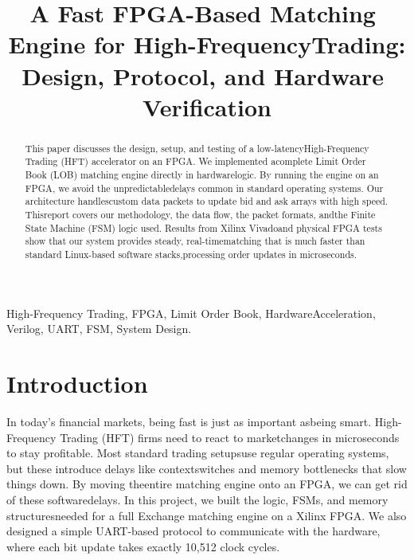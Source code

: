\documentclass[conference,a4paper]{IEEEtran}
\begin{document}
\title{\Large ​A Fast ​FPGA-Based ​Matching ​Engine ​for ​High-Frequency ​Trading: ​Design, ​Protocol, ​and ​Hardware ​Verification}


\author{
}

\maketitle

\begin{abstract}
This​ paper​ discusses​ the​ design,​ setup,​ and​ testing​ of​ a​ low-latency​ High-Frequency​ Trading​ (HFT)​ accelerator​ on​ an​ FPGA.​ We​ implemented​ a​ complete​ Limit​ Order​ Book​ (LOB)​ matching​ engine​ directly​ in​ hardware​ logic.​ By​ running​ the​ engine​ on​ an​ FPGA,​ we​ avoid​ the​ unpredictable​ delays​ common​ in​ standard​ operating​ systems.​ Our​ architecture​ handles​ custom​ data​ packets​ to​ update​ bid​ and​ ask​ arrays​ with​ high​ speed.​ This​ report​ covers​ our​ methodology,​ the​ data​ flow,​ the​ packet​ formats,​ and​ the​ Finite​ State​ Machine​ (FSM)​ logic​ used.​ Results​ from​ Xilinx​ Vivado​ and​ physical​ FPGA​ tests​ show​ that​ our​ system​ provides​ steady,​ real-time​ matching​ that​ is​ much​ faster​ than​ standard​ Linux-based​ software​ stacks,​ processing​ order​ updates​ in​ microseconds.
\end{abstract}

\begin{IEEEkeywords}
High-Frequency ​Trading, ​FPGA, ​Limit ​Order ​Book, ​Hardware ​Acceleration, ​Verilog, ​UART, ​FSM, ​System ​Design.
\end{IEEEkeywords}

\section{Introduction}
In​ today's​ financial​ markets,​ being​ fast​ is​ just​ as​ important​ as​ being​ smart.​ High-Frequency​ Trading​ (HFT)​ firms​ need​ to​ react​ to​ market​ changes​ in​ microseconds​ to​ stay​ profitable.​ Most​ standard​ trading​ setups​ use​ regular​ operating​ systems,​ but​ these​ introduce​ delays​ like​ context​ switches​ and​ memory​ bottlenecks​ that​ slow​ things​ down. ​By​ moving​ the​ entire​ matching​ engine​ onto​ an​ FPGA,​ we​ can​ get​ rid​ of​ these​ software​ delays.​ In​ this​ project,​ we​ built​ the​ logic,​ FSMs,​ and​ memory​ structures​ needed​ for​ a​ full​ Exchange​ matching​ engine​ on​ a​ Xilinx​ FPGA.​ We​ also​ designed​ a​ simple​ UART-based​ protocol​ to​ communicate​ with​ the​ hardware,​ where​ each​ bit​ update​ takes​ exactly​ 10,512​ clock​ cycles.
\end{document}
